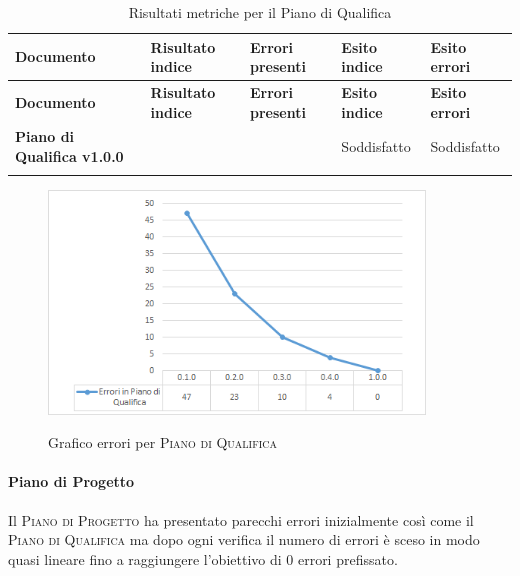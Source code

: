 \documentclass[../piano-di-qualifica.tex]{subfiles}
\begin{document}
\renewcommand{\arraystretch}{2} %
\begin{longtable}[H]{>{\centering\bfseries}m{6cm} >{\centering}m{2cm} >{\centering}m{2.5cm} >{\centering}m{2.5cm} >{\centering\arraybackslash}m{2.5cm}}  
  \rowcolor{lightgray}
  {\textbf{Documento}} & {\textbf{Risultato indice}} & {\textbf{Errori presenti}} & {\textbf{Esito indice}} & {\textbf{Esito errori}}  \\
  \endfirsthead%
  \rowcolor{lightgray}
  {\textbf{Documento}} & {\textbf{Risultato indice}} & {\textbf{Errori presenti}} & {\textbf{Esito indice}} & {\textbf{Esito errori}}  \\
  \endhead%
  \textbf{Piano di Qualifica v1.0.0} &  59                & 0               & Soddisfatto & Soddisfatto \\
  \caption{Risultati metriche per il Piano di Qualifica}
  \label{tab:my-table}
\end{longtable}

\begin{figure}[H]
    \centering
    \includegraphics[width=10cm]{img/erroriPdQ.png}
    \label{fig:scice_documenti}
    \caption{Grafico errori per \textsc{Piano di Qualifica}}
\end{figure}

\paragraph{Piano di Progetto}
\label{sub:piano_di_progetto}
Il \textsc{Piano di Progetto} ha presentato parecchi errori inizialmente così come il \textsc{Piano di Qualifica} ma dopo ogni verifica il numero di errori è sceso in modo quasi lineare fino a raggiungere l'obiettivo di 0 errori prefissato.
\end{document}
